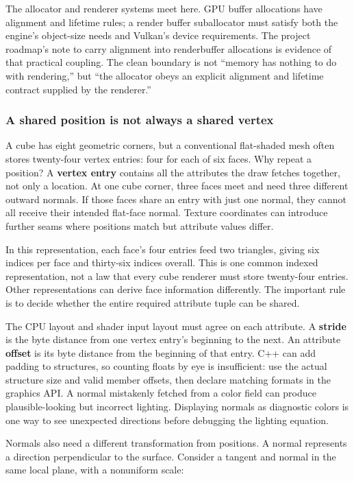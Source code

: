 The allocator and renderer systems meet here. GPU buffer allocations have alignment and lifetime rules; a render buffer suballocator must satisfy both the engine's object-size needs and Vulkan's device requirements. The project roadmap's note to carry alignment into renderbuffer allocations is evidence of that practical coupling. The clean boundary is not ``memory has nothing to do with rendering,'' but ``the allocator obeys an explicit alignment and lifetime contract supplied by the renderer.''

\subsubsection{A shared position is not always a shared vertex}\label{06-engine-ii-ch025-a-shared-position-is-not-always-a-shared-vertex}

A cube has eight geometric corners, but a conventional flat-shaded mesh often stores twenty-four vertex entries: four for each of six faces. Why repeat a position? A \textbf{vertex entry} contains all the attributes the draw fetches together, not only a location. At one cube corner, three faces meet and need three different outward normals. If those faces share an entry with just one normal, they cannot all receive their intended flat-face normal. Texture coordinates can introduce further seams where positions match but attribute values differ.

In this representation, each face's four entries feed two triangles, giving six indices per face and thirty-six indices overall. This is one common indexed representation, not a law that every cube renderer must store twenty-four entries. Other representations can derive face information differently. The important rule is to decide whether the entire required attribute tuple can be shared.

The CPU layout and shader input layout must agree on each attribute. A \textbf{stride} is the byte distance from one vertex entry's beginning to the next. An attribute \textbf{offset} is its byte distance from the beginning of that entry. C++ can add padding to structures, so counting floats by eye is insufficient: use the actual structure size and valid member offsets, then declare matching formats in the graphics API. A normal mistakenly fetched from a color field can produce plausible-looking but incorrect lighting. Displaying normals as diagnostic colors is one way to see unexpected directions before debugging the lighting equation.

Normals also need a different transformation from positions. A normal represents a direction perpendicular to the surface. Consider a tangent and normal in the same local plane, with a nonuniform scale:

